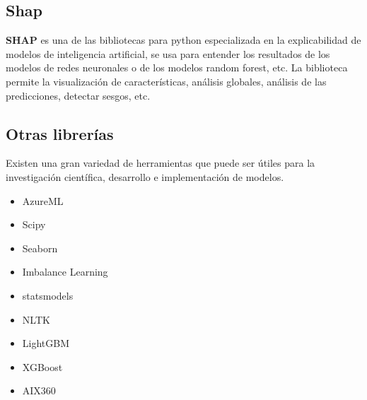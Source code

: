 \subsection{Shap}

\textbf{SHAP} es una de las bibliotecas para python especializada en la explicabilidad de modelos de inteligencia artificial, se usa para entender los resultados de los modelos de redes neuronales o de los modelos random forest, etc. La biblioteca permite la visualización de características, análisis globales, análisis de las predicciones, detectar sesgos, etc.


\subsection{Otras librerías}

Existen una gran variedad de herramientas que puede ser útiles para la investigación científica, desarrollo e implementación de modelos.

\begin{multicols}{3} 
    \begin{itemize}
        \item AzureML
        \item Scipy
        \item Seaborn
        \item Imbalance Learning
        \item statsmodels
        \item NLTK
        \item LightGBM
        \item XGBoost
        \item AIX360
    \end{itemize}
\end{multicols}